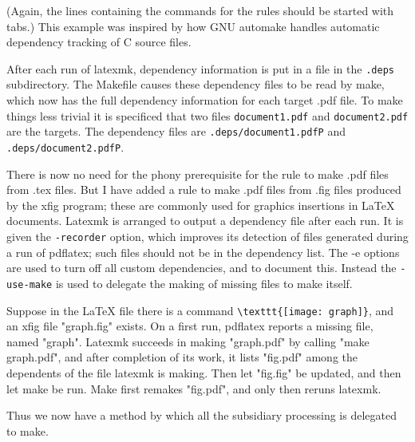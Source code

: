 (Again,  the  lines  containing  the  commands  for the rules should be started
with tabs.)  This example was inspired by how GNU automake handles automatic
dependency tracking of C source files.

After  each  run of latexmk, dependency information is put in a file in
the \verb|.deps| subdirectory.  The Makefile causes these dependency files  to
be read by make, which now has the full dependency information for each target
.pdf file.  To make things less trivial it  is  specificed  that two  files
\verb|document1.pdf| and \verb|document2.pdf| are the targets.  The dependency files are
\verb|.deps/document1.pdfP| and \verb|.deps/document2.pdfP|.

There is now no need for the phony prerequisite for the  rule  to  make .pdf
files from .tex files.  But I have added a rule to make .pdf files from .fig
files produced by the xfig program; these are  commonly  used for  graphics
insertions  in  LaTeX documents.  Latexmk is arranged to output a dependency
file after each run.  It is given the \verb|-recorder| option,  which  improves its
detection of files generated during a run of pdflatex; such files should not be
in the dependency list.  The -e  options  are  used  to  turn off all custom
dependencies, and to document this.  Instead the \verb|-use-make| is used to delegate
the making of  missing files to make itself.

Suppose  in  the LaTeX file there is a command \verb|\texttt{[image: graph]}|, and an
xfig file "graph.fig" exists.  On a first run, pdflatex  reports a  missing
file, named "graph". Latexmk succeeds in making "graph.pdf" by calling "make
graph.pdf", and after completion of its work, it lists "fig.pdf" among the
dependents of the file latexmk is making.  Then let "fig.fig" be updated, and
then let make be  run.   Make  first  remakes "fig.pdf", and only then reruns
latexmk.

Thus  we  now  have  a method by which all the subsidiary processing is
delegated to make.



